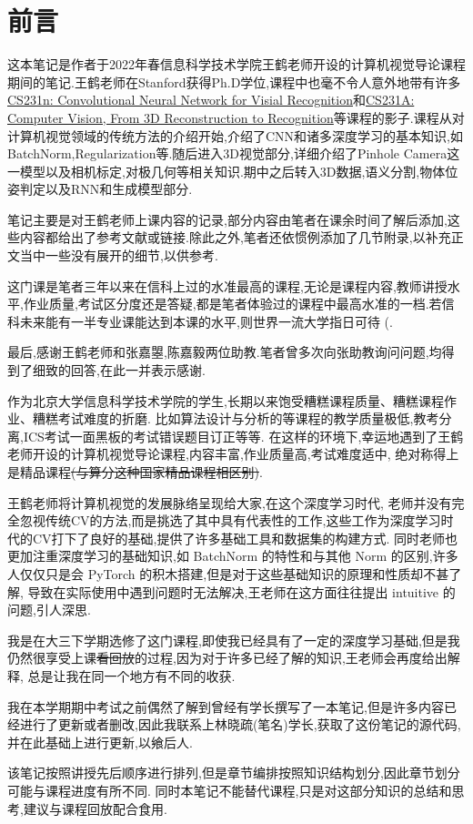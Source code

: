 \chapter*{前言}

这本笔记是作者于2022年春信息科学技术学院王鹤老师开设的计算机视觉导论课程期间的笔记.王鹤老师在Stanford获得Ph.D学位,课程中也毫不令人意外地带有许多\href{https://cs231n.github.io/}{CS231n: Convolutional Neural Network for Visial Recognition}和\href{https://web.stanford.edu/class/cs231a/course_notes.html}{CS231A: Computer Vision, From 3D Reconstruction to Recognition}等课程的影子.课程从对计算机视觉领域的传统方法的介绍开始,介绍了CNN和诸多深度学习的基本知识,如BatchNorm,Regularization等.随后进入3D视觉部分,详细介绍了Pinhole Camera这一模型以及相机标定,对极几何等相关知识.期中之后转入3D数据,语义分割,物体位姿判定以及RNN和生成模型部分.

笔记主要是对王鹤老师上课内容的记录,部分内容由笔者在课余时间了解后添加,这些内容都给出了参考文献或链接.除此之外,笔者还依惯例添加了几节附录,以补充正文当中一些没有展开的细节,以供参考.

这门课是笔者三年以来在信科上过的水准最高的课程,无论是课程内容,教师讲授水平,作业质量,考试区分度还是答疑,都是笔者体验过的课程中最高水准的一档.若信科未来能有一半专业课能达到本课的水平,则世界一流大学指日可待 (.

最后,感谢王鹤老师和张嘉曌,陈嘉毅两位助教.笔者曾多次向张助教询问问题,均得到了细致的回答,在此一并表示感谢.



作为北京大学信息科学技术学院的学生,长期以来饱受糟糕课程质量、糟糕课程作业、糟糕考试难度的折磨.
比如算法设计与分析的等课程的教学质量极低,教考分离,ICS考试一面黑板的考试错误题目订正等等.
在这样的环境下,幸运地遇到了王鹤老师开设的计算机视觉导论课程,内容丰富,作业质量高,考试难度适中,
绝对称得上是精品课程\sout{(与算分这种国家精品课程相区别)}.

王鹤老师将计算机视觉的发展脉络呈现给大家,在这个深度学习时代,
老师并没有完全忽视传统CV的方法,而是挑选了其中具有代表性的工作,这些工作为深度学习时代的CV打下了良好的基础,提供了许多基础工具和数据集的构建方式.
同时老师也更加注重深度学习的基础知识,如 BatchNorm 的特性和与其他 Norm 的区别,许多人仅仅只是会 PyTorch 的积木搭建,但是对于这些基础知识的原理和性质却不甚了解,
导致在实际使用中遇到问题时无法解决,王老师在这方面往往提出 intuitive 的问题,引人深思.

我是在大三下学期选修了这门课程,即使我已经具有了一定的深度学习基础,但是我仍然很享受上课\sout{看回放}的过程,因为对于许多已经了解的知识,王老师会再度给出解释,
总是让我在同一个地方有不同的收获.

我在本学期期中考试之前偶然了解到曾经有学长撰写了一本笔记,但是许多内容已经进行了更新或者删改,因此我联系上林晓疏(笔名)学长,获取了这份笔记的源代码,
并在此基础上进行更新,以飨后人.

该笔记按照讲授先后顺序进行排列,但是章节编排按照知识结构划分,因此章节划分可能与课程进度有所不同.
同时本笔记不能替代课程,只是对这部分知识的总结和思考,建议与课程回放配合食用.

